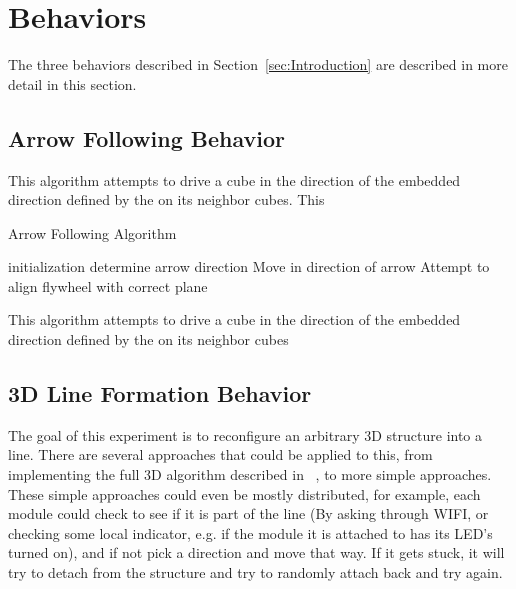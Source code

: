 \section{Behaviors}
\label{sec:Behaviors}

The three behaviors described in Section~\ref{sec:Introduction} are described in more detail in this section. 

\subsection{Arrow Following Behavior}
\label{sec:algArrow}
This algorithm attempts to drive a cube in the direction of the embedded direction defined by the \tagName on its neighbor cubes. This 
	
\begin{algorithm}[ht] 
	\caption{Arrow Following Algorithm}
	\label{algorithmArrow}
	\SetAlgoLined
	initialization\;
	{
		determine arrow direction\;
		{
			Move in direction of arrow\;
		}
		{
			 Attempt to align flywheel with correct plane\;
		}
	}
	\caption{This algorithm attempts to drive a cube in the direction of the embedded direction defined by the \tagName on its neighbor cubes}

\end{algorithm}

\subsection{3D Line Formation Behavior}
\label{ssec:algline}
The goal of this experiment is to reconfigure an arbitrary 3D structure into a line. There are several approaches that could be applied to this, from implementing the full 3D algorithm described in ~\cite{sung2015reconfiguration}, to more simple approaches. These simple approaches could even be mostly distributed, for example, each module could check to see if it is part of the line (By asking through WIFI, or checking some local indicator, e.g. if the module it is attached to has its LED's turned on), and if not pick a direction and move that way. If it gets stuck, it will try to detach from the structure and try to randomly attach back and try again.

